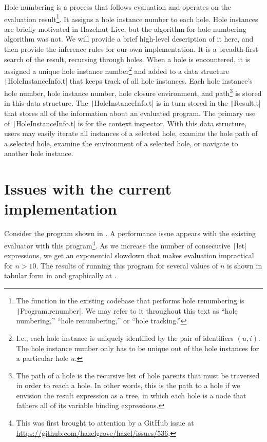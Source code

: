 Hole numbering is a process that follows evaluation and operates on the evaluation result\footnote{The function in the existing codebase that performs hole renumbering is \texttt|Program.renumber|. We may refer to it throughout this text as ``hole numbering,'' ``hole renumbering,'' or ``hole tracking.''}. It assigns a hole instance number to each hole. Hole instances are briefly motivated in Hazelnut Live, but the algorithm for hole numbering algorithm was not. We will provide a brief high-level description of it here, and then provide the inference rules for our own implementation. It is a breadth-first search of the result, recursing through holes. When a hole is encountered, it is assigned a unique hole instance number\footnote{I.e., each hole instance is uniquely identified by the pair of identifiers $(u,i)$. The hole instance number only has to be unique out of the hole instances for a particular hole $u$.} and added to a data structure \texttt|HoleInstanceInfo.t| that keeps track of all hole instances. Each hole instance's hole number, hole instance number, hole closure environment, and path\footnote{The path of a hole is the recursive list of hole parents that must be traversed in order to reach a hole. In other words, this is the path to a hole if we envision the result expression as a tree, in which each hole is a node that fathers all of its variable binding expressions.} is stored in this data structure. The \texttt|HoleInstanceInfo.t| is in turn stored in the \texttt|Result.t| that stores all of the information about an evaluated program. The primary use of \texttt|HoleInstanceInfo.t| is for the context inspector. With this data structure, users may easily iterate all instances of a selected hole, examine the hole path of a selected hole, examine the environment of a selected hole, or navigate to another hole instance.

\section{Issues with the current implementation}
\label{sec:current-problems}

Consider the program shown in . A performance issue appears with the existing evaluator with this program\footnote{This was first brought to attention by a GitHub issue at \url{https://github.com/hazelgrove/hazel/issues/536}.}. As we increase the number of consecutive \texttt|let| expressions, we get an exponential slowdown that makes evaluation impractical for $n>10$. The results of running this program for several values of $n$ is shown in tabular form in  and graphically at .

